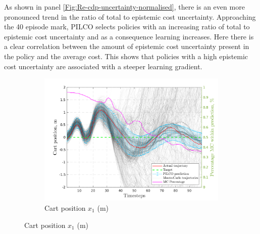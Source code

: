 As shown in panel \ref{Fig:Re-cdp-uncertainty-normalised}, there is an even more pronounced trend in the ratio of total to epistemic cost uncertainty. Approaching the 40 episode mark, PILCO selects policies with an increasing ratio of total to epistemic cost uncertainty and as a consequence learning increases. Here there is a clear correlation between the amount of epistemic cost uncertainty present in the policy and the average cost. This shows that policies with a high epistemic cost uncertainty are associated with a steeper learning gradient. 

 \begin{figure}[htbp]    
    \begin{subfigure}[b]{1\linewidth}
    \centering
    \includegraphics[height=0.4\textheight,width=1\textwidth]{Chapter3/Figures/cdp_MC_rollout_Ep_80_Dim_1.png} 
    \caption{Cart position $x_1$ (m)} 
    \label{Fig:Re-cdp-cart-position} 
  \end{subfigure} 


\end{figure}
